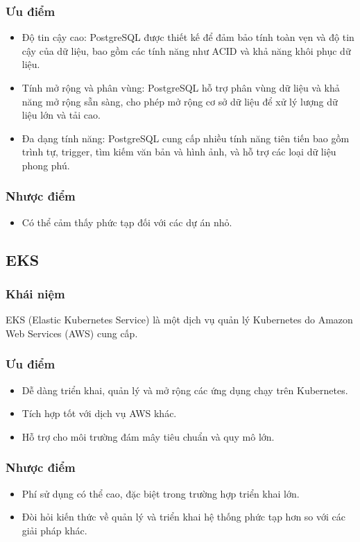 \subsubsection{Ưu điểm}
\begin{itemize}
    \item Độ tin cậy cao: PostgreSQL được thiết kế để đảm bảo tính toàn vẹn và độ tin cậy của dữ liệu, bao gồm các tính năng như ACID và khả năng khôi phục dữ liệu.
    \item Tính mở rộng và phân vùng: PostgreSQL hỗ trợ phân vùng dữ liệu và khả năng mở rộng sẵn sàng, cho phép mở rộng cơ sở dữ liệu để xử lý lượng dữ liệu lớn và tải cao.
    \item Đa dạng tính năng: PostgreSQL cung cấp nhiều tính năng tiên tiến bao gồm trình tự, trigger, tìm kiếm văn bản và hình ảnh, và hỗ trợ các loại dữ liệu phong phú.
\end{itemize}
\subsubsection{Nhược điểm}
\begin{itemize}
    \item Có thể cảm thấy phức tạp đối với các dự án nhỏ.
\end{itemize}
\subsection{EKS}
\subsubsection{Khái niệm}
\noindent EKS (Elastic Kubernetes Service) là một dịch vụ quản lý Kubernetes do Amazon Web Services (AWS) cung cấp.
\subsubsection{Ưu điểm}
\begin{itemize}
    \item Dễ dàng triển khai, quản lý và mở rộng các ứng dụng chạy trên Kubernetes.
    \item Tích hợp tốt với dịch vụ AWS khác.
    \item Hỗ trợ cho môi trường đám mây tiêu chuẩn và quy mô lớn.
\end{itemize}
\subsubsection{Nhược điểm}
\begin{itemize}
    \item Phí sử dụng có thể cao, đặc biệt trong trường hợp triển khai lớn.
    \item Đòi hỏi kiến thức về quản lý và triển khai hệ thống phức tạp hơn so với các giải pháp khác.
\end{itemize}
